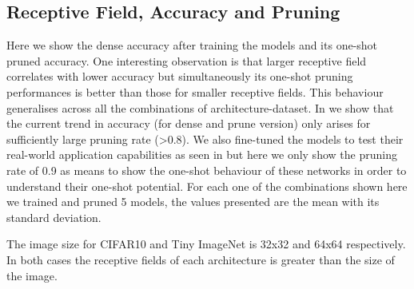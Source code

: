\subsection{Receptive Field, Accuracy and Pruning}
\label{sec:rfanda}
Here we show the dense accuracy after training the models and its one-shot pruned accuracy. One interesting observation
is that larger receptive field correlates with lower accuracy but simultaneously its one-shot pruning performances is
better than those for smaller receptive fields. This behaviour generalises across all the combinations of
architecture-dataset. In  we show that the current trend in accuracy (for dense and prune version) only
arises for sufficiently large pruning rate (>0.8). We also fine-tuned the models to test their real-world application
capabilities as seen  in  but here we only show the pruning rate of 0.9 as means to
show the one-shot behaviour of these networks in order to understand their one-shot potential.
For each one of the combinations shown here we trained and pruned 5 models, the values presented are the mean  with its
standard deviation.

The image size for CIFAR10 and Tiny ImageNet is 32x32 and  64x64 respectively. In both cases the receptive fields of
each architecture is greater than the size of the image.

